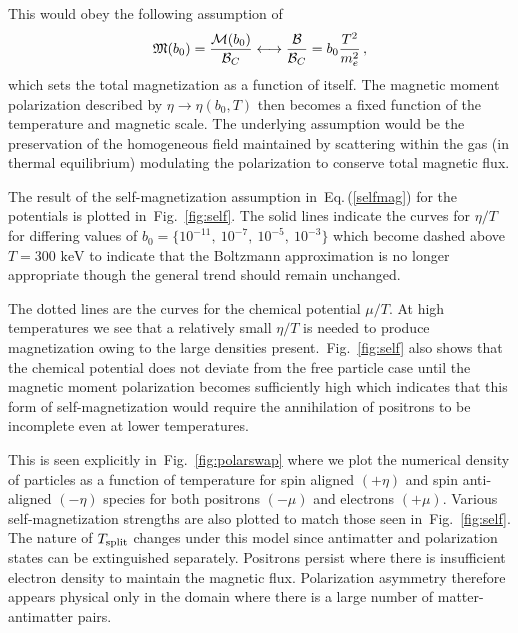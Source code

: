 \documentclass[aps,prd,floatfix,reprint]{revtex4-2}
\newcommand*{\keV}{\text{ keV}}
\newcommand{\req}[1]{Eq.\,(\ref{#1})}
\newcommand{\rf}[1]{Fig.~{\ref{#1}}}
\begin{document}
This would obey the following assumption of
\begin{align}
 \label{selfmag}
 {\mathfrak M}(b_{0})=\frac{{\cal M}(b_0)}{{\cal B}_{C}}\longleftrightarrow\frac{\cal B}{{\cal B}_{C}}=b_{0}\frac{T^{2}}{m_{e}^{2}}\,,
\end{align}
which sets the total magnetization as a function of itself. The magnetic moment polarization described by $\eta\rightarrow\eta(b_{0},T)$ then becomes a fixed function of the temperature and magnetic scale. The underlying assumption would be the preservation of the homogeneous field maintained by scattering within the gas (in thermal equilibrium) modulating the polarization to conserve total magnetic flux.

The result of the self-magnetization assumption in~\req{selfmag} for the potentials is plotted in~\rf{fig:self}. The solid lines indicate the curves for $\eta/T$ for differing values of $b_{0}=\{10^{-11},\ 10^{-7},\ 10^{-5},\ 10^{-3}\}$ which become dashed above $T=300\keV$ to indicate that the Boltzmann approximation is no longer appropriate though the general trend should remain unchanged. 

The dotted lines are the curves for the chemical potential $\mu/T$. At high temperatures we see that a relatively small $\eta/T$ is needed to produce magnetization owing to the large densities present.~\rf{fig:self} also shows that the chemical potential does not deviate from the free particle case until the magnetic moment polarization becomes sufficiently high which indicates that this form of self-magnetization would require the annihilation of positrons to be incomplete even at lower temperatures.

This is seen explicitly in~\rf{fig:polarswap} where we plot the numerical density of particles as a function of temperature for spin aligned $(+\eta)$ and spin anti-aligned $(-\eta)$ species for both positrons $(-\mu)$ and electrons $(+\mu)$. Various self-magnetization strengths are also plotted to match those seen in~\rf{fig:self}. The nature of $T_{\rm split}$ changes under this model since antimatter and polarization states can be extinguished separately. Positrons persist where there is insufficient electron density to maintain the magnetic flux. Polarization asymmetry therefore appears physical only in the domain where there is a large number of matter-antimatter pairs.
\end{document}
